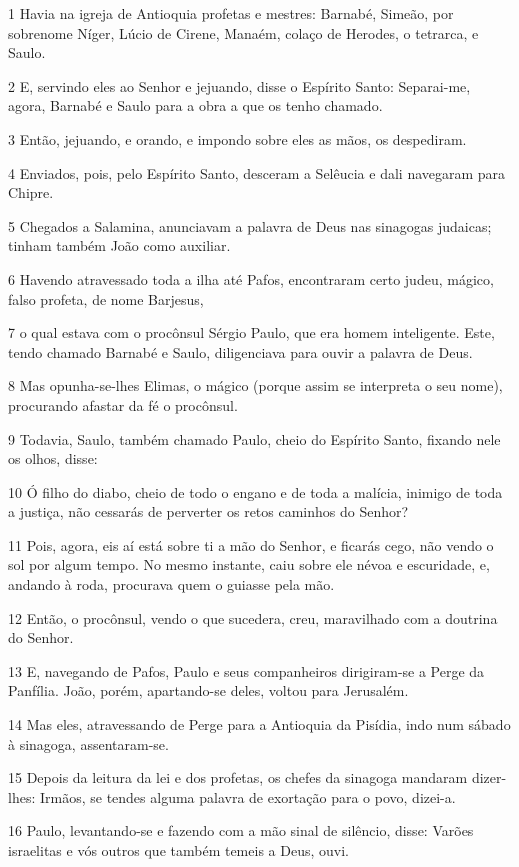 \par 1 Havia na igreja de Antioquia profetas e mestres: Barnabé, Simeão, por sobrenome Níger, Lúcio de Cirene, Manaém, colaço de Herodes, o tetrarca, e Saulo.
\par 2 E, servindo eles ao Senhor e jejuando, disse o Espírito Santo: Separai-me, agora, Barnabé e Saulo para a obra a que os tenho chamado.
\par 3 Então, jejuando, e orando, e impondo sobre eles as mãos, os despediram.
\par 4 Enviados, pois, pelo Espírito Santo, desceram a Selêucia e dali navegaram para Chipre.
\par 5 Chegados a Salamina, anunciavam a palavra de Deus nas sinagogas judaicas; tinham também João como auxiliar.
\par 6 Havendo atravessado toda a ilha até Pafos, encontraram certo judeu, mágico, falso profeta, de nome Barjesus,
\par 7 o qual estava com o procônsul Sérgio Paulo, que era homem inteligente. Este, tendo chamado Barnabé e Saulo, diligenciava para ouvir a palavra de Deus.
\par 8 Mas opunha-se-lhes Elimas, o mágico (porque assim se interpreta o seu nome), procurando afastar da fé o procônsul.
\par 9 Todavia, Saulo, também chamado Paulo, cheio do Espírito Santo, fixando nele os olhos, disse:
\par 10 Ó filho do diabo, cheio de todo o engano e de toda a malícia, inimigo de toda a justiça, não cessarás de perverter os retos caminhos do Senhor?
\par 11 Pois, agora, eis aí está sobre ti a mão do Senhor, e ficarás cego, não vendo o sol por algum tempo. No mesmo instante, caiu sobre ele névoa e escuridade, e, andando à roda, procurava quem o guiasse pela mão.
\par 12 Então, o procônsul, vendo o que sucedera, creu, maravilhado com a doutrina do Senhor.
\par 13 E, navegando de Pafos, Paulo e seus companheiros dirigiram-se a Perge da Panfília. João, porém, apartando-se deles, voltou para Jerusalém.
\par 14 Mas eles, atravessando de Perge para a Antioquia da Pisídia, indo num sábado à sinagoga, assentaram-se.
\par 15 Depois da leitura da lei e dos profetas, os chefes da sinagoga mandaram dizer-lhes: Irmãos, se tendes alguma palavra de exortação para o povo, dizei-a.
\par 16 Paulo, levantando-se e fazendo com a mão sinal de silêncio, disse: Varões israelitas e vós outros que também temeis a Deus, ouvi.
